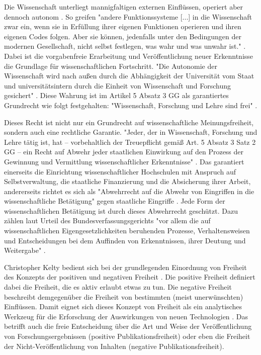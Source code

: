 Die Wissenschaft unterliegt mannigfaltigen externen Einflüssen, operiert aber dennoch autonom \cite{Luhmann_1998}. So greifen "andere Funktionssysteme [...] in die Wissenschaft zwar ein, wenn sie in Erfüllung ihrer eigenen Funktionen operieren und ihren eigenen Codes folgen. Aber sie können, jedenfalls unter den Bedingungen der modernen Gesellschaft, nicht selbst festlegen, was wahr und was unwahr ist."  \cite{Luhmann_1998}. Dabei ist die vorgabenfreie Erarbeitung und Veröffentlichung neuer Erkenntnisse die Grundlage für wissenschaftlichen Fortschritt. "Die Autonomie der Wissenschaft wird nach außen durch die Abhängigkeit der Universität vom Staat und universitätsintern durch die Einheit von Wissenschaft und Forschung gesichert" \cite{Huber_2005}. Diese Wahrung ist im Artikel 5 Absatz 3 GG als garantiertes Grundrecht wie folgt festgehalten: "Wissenschaft, Forschung und Lehre sind frei" \cite{grundgesetz_a5}.

Dieses Recht ist nicht nur ein Grundrecht auf wissenschaftliche Meinungsfreiheit, sondern auch eine rechtliche Garantie. "Jeder, der in Wissenschaft, Forschung und Lehre tätig ist, hat – vorbehaltlich der Treuepflicht gemäß Art. 5 Absatz 3 Satz 2 GG – ein Recht auf Abwehr jeder staatlichen Einwirkung auf den Prozess der Gewinnung und Vermittlung wissenschaftlicher Erkenntnisse" \cite{BVerfGE_1973}. Das garantiert einerseits die Einrichtung wissenschaftlicher Hochschulen mit Anspruch auf Selbstverwaltung, die staatliche Finanzierung und die Absicherung ihrer Arbeit, andererseits richtet es sich als "Abwehrrecht auf die Abwehr von Eingriffen in die wissenschaftliche Betätigung" gegen staatliche Eingriffe \cite{Mayen_1992} \cite{Spindler_2006}. Jede Form der wissenschaftlichen Betätigung ist durch dieses Abwehrrecht geschützt. Dazu zählen laut Urteil des Bundesverfassungsgerichts "vor allem die auf wissenschaftlichen Eigengesetzlichkeiten beruhenden Prozesse, Verhaltensweisen und Entscheidungen bei dem Auffinden von Erkenntnissen, ihrer Deutung und Weitergabe" \cite{BVerfGE_1973}.

Christopher Kelty bedient sich bei der grundlegenden Einordnung von Freiheit des Konzepts der positiven und negativen Freiheit \cite{Kelty_2014}. Die positive Freiheit definiert dabei die Freiheit, die es aktiv erlaubt etwas zu tun. Die negative Freiheit beschreibt demgegenüber die Freiheit von bestimmten (meist unerwünschten) Einflüssen. Damit eignet sich dieses Konzept von Freiheit als ein analytisches Werkzeug für die Erforschung der Auswirkungen von neuen Technologien \cite{Kelty_2014}. Das betrifft auch die freie Entscheidung über die Art und Weise der Veröffentlichung von Forschungsergebnissen (positive Publikationsfreiheit) \cite{Fangerau_2014} \cite[:190]{Fehling_2014} oder eben die Freiheit der Nicht-Veröffentlichung von Inhalten (negative Publikationsfreiheit).

